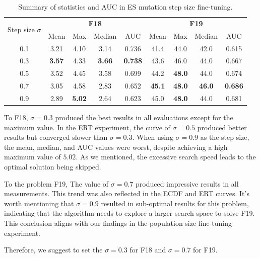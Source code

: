 \documentclass{article}
\begin{document}
\begin{table}[!ht]
    \centering
    \caption{Summary of statistics and AUC in ES mutation step size fine-tuning.}
    \label{tab:experi-es-ssize}
    \begin{tabular}{ccccccccc}
        \toprule
        \multirow{2}[3]{*}{Step size $\sigma$} &
        \multicolumn{4}{c}{\textbf{F18}} &
        \multicolumn{4}{c}{\textbf{F19}}\\
        \cmidrule(lr){2-5}
        \cmidrule(lr){6-9}
        & Mean & Max & Median & AUC & Mean & Max & Median & AUC\\
        \midrule
        0.1  & 3.21 & 4.10 & 3.14 & 0.736 & 41.4 & 44.0 & 42.0 & 0.615 \\
        0.3  & \textbf{3.57} & 4.33 & \textbf{3.66} & \textbf{0.738} & 43.6 & 46.0 & 44.0 & 0.667\\
        0.5  & 3.52 & 4.45 & 3.58 & 0.699 & 44.2 & \textbf{48.0} & 44.0 & 0.674\\
        0.7  & 3.05 & 4.58 & 2.83 & 0.652 & \textbf{45.1} & \textbf{48.0} & \textbf{46.0} & \textbf{0.686}\\
        0.9  & 2.89 & \textbf{5.02} & 2.64 & 0.623 & 45.0 & \textbf{48.0} & 44.0 & 0.681\\
        \bottomrule
    \end{tabular}
\end{table}

To F18, $\sigma=0.3$ produced the best results in all evaluations except for the maximum value. In the ERT experiment, the curve of $\sigma=0.5$ produced better results but converged slower than $\sigma=0.3$. When using $\sigma=0.9$ as the step size, the mean, median, and AUC values were worst, despite achieving a high maximum value of $5.02$. As we mentioned, the excessive search speed leads to the optimal solution being skipped. 

To the problem F19, The value of $\sigma=0.7$ produced impressive results in all measurements. This trend was also reflected in the ECDF and ERT curves. It's worth mentioning that $\sigma=0.9$ resulted in sub-optimal results for this problem, indicating that the algorithm needs to explore a larger search space to solve F19. This conclusion aligns with our findings in the population size fine-tuning experiment.

Therefore, we suggest to set the $\sigma=0.3$ for F18 and $\sigma=0.7$ for F19.
\end{document}
